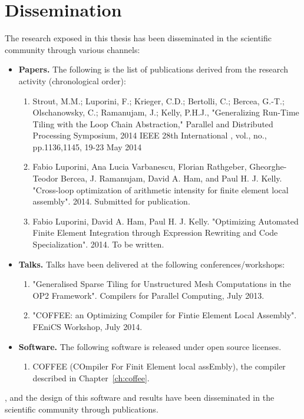 \section{Dissemination}
The research exposed in this thesis has been disseminated in the scientific community through various channels:
\begin{itemize}
\item \textbf{Papers.} The following is the list of publications derived from the research activity (chronological order):
\begin{enumerate}
\item Strout, M.M.; Luporini, F.; Krieger, C.D.; Bertolli, C.; Bercea, G.-T.; Olschanowsky, C.; Ramanujam, J.; Kelly, P.H.J., "Generalizing Run-Time Tiling with the Loop Chain Abstraction," Parallel and Distributed Processing Symposium, 2014 IEEE 28th International , vol., no., pp.1136,1145, 19-23 May 2014
\item Fabio Luporini, Ana Lucia Varbanescu, Florian Rathgeber, Gheorghe-Teodor Bercea, J. Ramanujam, David A. Ham, and Paul H. J. Kelly. "Cross-loop optimization of arithmetic intensity for finite element local assembly". 2014. Submitted for publication.
\item Fabio Luporini, David A. Ham, Paul H. J. Kelly. "Optimizing Automated Finite Element Integration through Expression Rewriting and Code Specialization". 2014. To be written.
\end{enumerate}
\item \textbf{Talks.} Talks have been delivered at the following conferences/workshops:
\begin{enumerate}
\item "Generalised Sparse Tiling for Unstructured Mesh Computations in the OP2 Framework". Compilers for Parallel Computing, July 2013.
\item "COFFEE: an Optimizing Compiler for Fintie Element Local Assembly". FEniCS Workshop, July 2014.
\end{enumerate}
\item \textbf{Software.} The following software is released under open source licenses.
\begin{enumerate}
\item COFFEE (COmpiler For Finit Element local assEmbly), the compiler described in Chapter~\ref{ch:coffee}.
\end{enumerate}
\end{itemize}
, and the design of this software and results have
been disseminated in the scientific community through publications.



